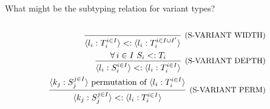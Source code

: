 \subsection{}

What might be the subtyping relation for variant types?\\~\\
\begin{align*}
	\infer[\text{\small{(S-VARIANT WIDTH)}}]
	{\TVAR{l_i: T_i^{i \in I}} <: \TVAR{l_i: T_i^{i \in I\cup I'}}}
	{}                              \\
	\infer[\text{\small{(S-VARIANT DEPTH)}}]
	{\TVAR{l_i: S_i^{i \in I}} <: \TVAR{l_i: T_i^{i \in I}}}
	{\forall\, i \in I\ S_i <: T_i} \\
	\infer[\text{\small{(S-VARIANT PERM)}}]
	{\TVAR{k_j: S_j^{j \in I}}<:\TVAR{l_i: T_i^{i \in I}}}
	{\TVAR{k_j: S_j^{j \in I}} \text{ permutation of } \TVAR{l_i: T_i^{i \in I}}}
\end{align*}
